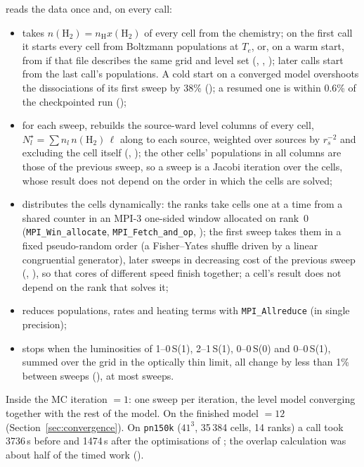  reads the data once and, on every call:
\begin{itemize}
\item takes $n(\mathrm{H_2})=n_{\mathrm H}x(\mathrm{H_2})$ of every cell
  from the chemistry; on the first call it starts every cell from Boltzmann
  populations at $T_e$, or, on a warm start, from 
  if that file describes the same grid and level set (,
  , ); later calls start from the last
  call's populations. A cold start on a converged model overshoots the
  dissociations of its first sweep by 38\% (); a resumed one is
  within 0.6\% of the checkpointed run ();
\item for each sweep, rebuilds the source-ward level columns of every cell,
  $N^\star_l=\sum n_l\,n(\mathrm{H_2})\,\ell$ along  to each
  source, weighted over sources by $r_s^{-2}$ and excluding the cell itself
  (, ); the other cells' populations in all
  columns are those of the previous sweep, so a sweep is a Jacobi iteration
  over the cells, whose result does not depend on the order in which the
  cells are solved;
\item distributes the cells dynamically: the ranks take cells one at a time
  from a shared counter in an MPI-3 one-sided window allocated on rank~0
  (\verb|MPI_Win_allocate|, \verb|MPI_Fetch_and_op|, ); the
  first sweep takes them in a fixed pseudo-random order (a Fisher--Yates shuffle
  driven by a linear congruential generator), later sweeps in decreasing cost
  of the previous sweep (, ), so that cores of
  different speed finish together; a cell's result does not depend on the rank
  that solves it;
\item reduces populations, rates and heating terms with \verb|MPI_Allreduce|
  (in single precision);
\item stops when the luminosities of 1--0\,S(1), 2--1\,S(1), 0--0\,S(0) and
  0--0\,S(1), summed over the grid in the optically thin limit, all change by
  less than 1\% between sweeps (), at most 
  sweeps.
\end{itemize}
Inside the MC iteration $=1$: one sweep per iteration, the
level model converging together with the rest of the model. On the finished
model $=12$ (Section~\ref{sec:convergence}). On \texttt{pn150k}
($41^3$, 35\,384 cells, 14 ranks) a call took 3736\,s before and 1474\,s after the
optimisations of ; the overlap calculation was about half of the
timed work ().
